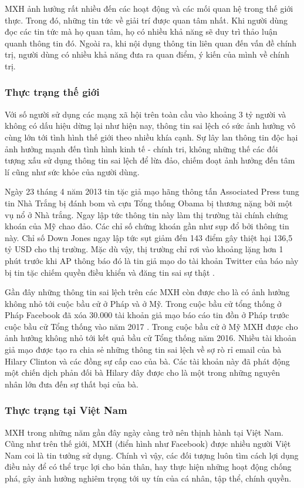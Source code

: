 	MXH ảnh hưởng rất nhiều đến các hoạt động và các mối quan hệ trong thế giới thực. Trong đó, những tin tức về giải trí được quan tâm nhất. Khi người dùng đọc các tin tức mà họ quan tâm, họ có nhiều khả năng sẽ duy trì thảo luận quanh thông tin đó. Ngoài ra, khi nội dụng thông tin liên quan đến vấn đề chính trị, người dùng có nhiều khả năng đưa ra quan điểm, ý kiến của mình về chính trị.
		\subsubsection{Thực trạng thế giới}
		Với số người sử dụng các mạng xã hội trên toàn cầu vào khoảng 3 tỷ người và không có dấu hiệu dừng lại như hiện nay, thông tin sai lệch có sức ảnh hưởng vô cùng lớn tới tình hình thế giới theo nhiều khía cạnh. Sự lây lan thông tin độc hại ảnh hưởng mạnh đến tình hình kinh tế - chính tri, không những thế các đối tượng xấu sử dụng thông tin sai lệch để lừa đảo, chiếm đoạt ảnh hưởng đến tâm lí cũng như sức khỏe của người dùng.
		 
		Ngày 23 tháng 4 năm 2013 tin tặc giả mạo hãng thông tấn Associated Press tung tin Nhà Trắng bị đánh bom và cựu Tổng thống Obama bị thương nặng bởi một vụ  nổ ở Nhà trắng. Ngay lập tức thông tin này làm thị trường tài chính chứng khoán của Mỹ chao đảo. Các chỉ số chứng khoán gần như sụp đổ bởi thông tin này. Chỉ số Down Jones ngay lập tức sụt giảm đến 143 điểm gây thiệt hại 136,5 tỷ USD cho thị trường. Mặc dù vậy, thị trường chỉ rơi vào khoảng lặng hơn 1 phút trước khi AP thông báo đó là tin giả mạo do tài khoản Twitter của báo này bị tin tặc chiếm quyền điều khiển và đăng tin sai sự thật \cite{APhack}.
		
		Gần đây những thông tin sai lệch trên các MXH còn được cho là có ảnh hưởng không nhỏ tới cuộc bầu cử ở Pháp và ở Mỹ. Trong cuộc bầu cử tổng thống ở Pháp Facebook đã xóa 30.000 tài khoản giả mạo báo cáo tin đồn ở Pháp trước cuộc bầu cử Tổng thống vào năm 2017 \cite{Anhhuong}. Trong cuộc bầu cử ở Mỹ MXH được cho ảnh hưởng không nhỏ tới kết quả bầu cử Tổng thống năm 2016. Nhiều tài khoản giả mạo được tạo ra chia sẻ những thông tin sai lệch về sợ rò rỉ email của bà Hilary Clinton và các đồng sự cấp cao của bà. Các tài khoản này đã phát động một chiến dịch phản đối bà Hilary đây được cho là một trong những nguyên nhân lớn đưa đến sự thất bại của bà.
		\subsubsection{Thực trạng tại Việt Nam}
		MXH trong những năm gần đây ngày càng trở nên thịnh hành tại Việt Nam. Cũng như trên thế giới, MXH (điển hình như Facebook) được nhiều người Việt Nam coi là tin tưởng sử dụng. Chính vì vậy, các đối tượng luôn tìm cách lợi dụng điều này để có thể trục lợi cho bản thân, hay thực hiện những hoạt động chống phá, gây ảnh hưởng nghiêm trọng tới uy tín của cá nhân, tập thể, chính quyền.
		
